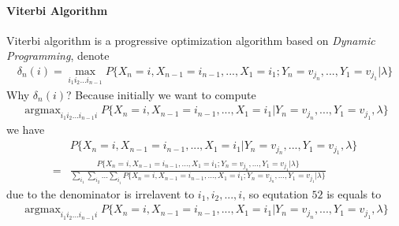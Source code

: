 \documentclass[runningheads]{llncs}
\begin{document}
\paragraph{Viterbi Algorithm}
\par
Viterbi algorithm is a progressive optimization algorithm based on \emph{Dynamic Programming},
denote
\begin{align}
    \delta_n(i) = \max_{i_1i_2...i_{n-1}} P \{ X_n = i, X_{n-1} = i_{n-1},..., X_1 = i_1; Y_n = v_{j_n},..., Y_1 = v_{j_1} |\lambda \}
\end{align}
Why $\delta_n(i)$?
Because initially we want to compute
\begin{align}
    \mathop{\arg\max}_{i_1i_2...i_{n-1}i} P \{ X_n = i, X_{n-1} = i_{n-1},..., X_1 = i_1| Y_n = v_{j_n},..., Y_1 = v_{j_1}, \lambda \}
\end{align}
we have
\begin{align}
    &P \{ X_n = i, X_{n-1} = i_{n-1},..., X_1 = i_1| Y_n = v_{j_n},..., Y_1 = v_{j_1}, \lambda \} \\
    = &\frac{P \{ X_n = i, X_{n-1} = i_{n-1},..., X_1 = i_1; Y_n = v_{j_n},..., Y_1 = v_{j_1} |\lambda \}}
    {\sum_{i_1} \sum_{i_2}...\sum_{i_i} P \{ X_n = i, X_{n-1} = i_{n-1},..., X_1 = i_1; Y_n = v_{j_n},..., Y_1 = v_{j_1} |\lambda \}}
\end{align}
due to the denominator is irrelavent to $i_1, i_2,..., i$, so equtation $52$
is equals to
\begin{align}
    \mathop{\arg\max}_{i_1i_2...i_{n-1}i} P \{ X_n = i, X_{n-1} = i_{n-1},..., X_1 = i_1| Y_n = v_{j_n},..., Y_1 = v_{j_1}, \lambda \}
\end{align}
\end{document}
